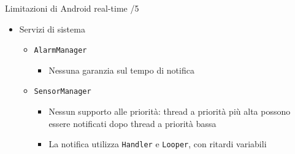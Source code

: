 \begin{frame}{Limitazioni di Android real-time /5}
	\begin{itemize}
		\item Servizi di sistema
		\begin{itemize}
			\item \texttt{AlarmManager}
			\begin{itemize}
				\item Nessuna garanzia sul tempo di notifica
			\end{itemize}
			\item \texttt{SensorManager}
			\begin{itemize}
				\item Nessun supporto alle priorità: thread a priorità più alta possono essere notificati dopo thread a priorità bassa
				\item La notifica utilizza \texttt{Handler} e \texttt{Looper}, con ritardi variabili
			\end{itemize}
		\end{itemize}
	\end{itemize}
\end{frame}